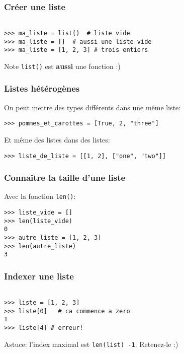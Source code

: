 \documentclass{beamer}
\begin{document}
\begin{frame}[fragile]
  \frametitle{Créer une liste}
\begin{lstlisting}

>>> ma_liste = list()  # liste vide
>>> ma_liste = []  # aussi une liste vide
>>> ma_liste = [1, 2, 3] # trois entiers

\end{lstlisting}

\vfill

\begin{alertblock}{Note}
  \texttt{list()} est \textbf{aussi} une fonction :)
\end{alertblock}

\end{frame}

\begin{frame}[fragile]
  \frametitle{Listes hétérogènes}

On peut mettre des types différents dans une même liste:

\begin{lstlisting}
>>> pommes_et_carottes = [True, 2, "three"]
\end{lstlisting}

\vfill
Et même des listes dans des listes:

\begin{lstlisting}
>>> liste_de_liste = [[1, 2], ["one", "two"]]
\end{lstlisting}


\end{frame}


\begin{frame}[fragile]
  \frametitle{Connaître la taille d'une liste}
Avec la fonction \texttt{len()}:

\vfill

\begin{lstlisting}
>>> liste_vide = []
>>> len(liste_vide)
0
>>> autre_liste = [1, 2, 3]
>>> len(autre_liste)
3
\end{lstlisting}

\end{frame}



\begin{frame}[fragile]
  \frametitle{Indexer une liste}

\begin{lstlisting}

>>> liste = [1, 2, 3]
>>> liste[0]   # ca commence a zero
1
>>> liste[4] # erreur!
\end{lstlisting}

\vfill

Astuce: l'index maximal est \texttt{len(list) -1}. Retenez-le :)

\end{frame}
\end{document}
